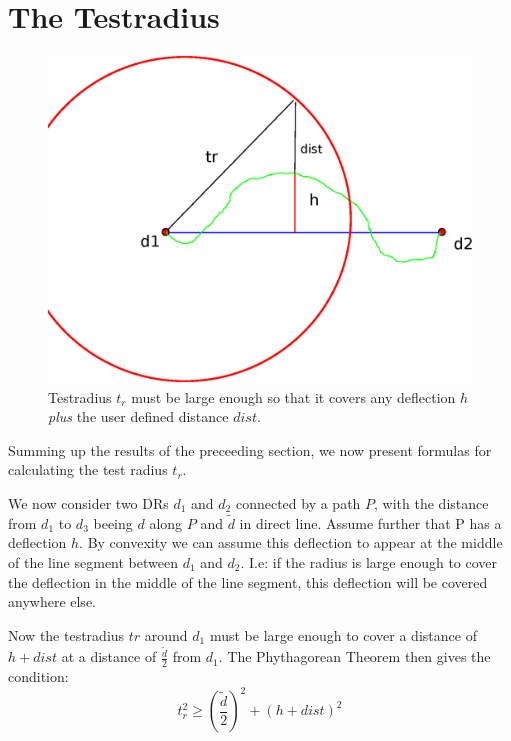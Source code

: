 \section{The Testradius}

\begin{figure}[h]
\includegraphics[scale=0.5]{images/03.06.testradius.eps}
\caption{Testradius $t_r$ must be large enough so that it covers any deflection $h$ \emph{plus} the user 
	 defined distance $dist$.
	}
\end{figure}

Summing up the results of the preceeding section, we now present formulas for calculating the 
test radius $t_r$.

We now consider two DRs $d_1$ and $d_2$ connected by a path $P$, with the distance from $d_1$ to $d_3$ beeing
$d$ along $P$ and $\tilde{d}$ in direct line. 
Assume further that P has a deflection $h$. By convexity we can assume this deflection to appear at the middle
of the line segment between $d_1$ and $d_2$. I.e: if the radius is large enough to cover the deflection
in the middle of the line segment, this deflection will be covered anywhere else.

Now the testradius $tr$ around $d_1$ must be large enough to cover a distance of $h+dist$ at a distance of $\frac{\tilde{d}}{2}$
from $d_1$.  The Phythagorean Theorem then gives the condition: 
\begin{equation}
\label{testradius_condition}
 t_r^2  \geq \left(\frac{\tilde{d}}{2}\right)^2 + \left(h+dist\right)^2
\end{equation}

